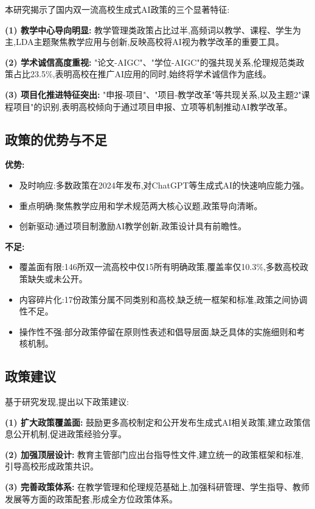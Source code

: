 \documentclass[cn,11pt,chinese]{article}
\begin{document}
本研究揭示了国内双一流高校生成式AI政策的三个显著特征:

\textbf{(1) 教学中心导向明显:} 教学管理类政策占比过半,高频词以教学、课程、学生为主,LDA主题聚焦教学应用与创新,反映高校将AI视为教学改革的重要工具。

\textbf{(2) 学术诚信高度重视:} "论文-AIGC"、"学位-AIGC"的强共现关系,伦理规范类政策占比23.5\%,表明高校在推广AI应用的同时,始终将学术诚信作为底线。

\textbf{(3) 项目化推进特征突出:} "申报-项目"、"项目-教学改革"等共现关系,以及主题2"课程项目"的识别,表明高校倾向于通过项目申报、立项等机制推动AI教学改革。

\subsection{政策的优势与不足}

\textbf{优势:}
\begin{itemize}
\item 及时响应:多数政策在2024年发布,对ChatGPT等生成式AI的快速响应能力强。
\item 重点明确:聚焦教学应用和学术规范两大核心议题,政策导向清晰。
\item 创新驱动:通过项目制激励AI教学创新,政策设计具有前瞻性。
\end{itemize}

\textbf{不足:}
\begin{itemize}
\item 覆盖面有限:146所双一流高校中仅15所有明确政策,覆盖率仅10.3\%,多数高校政策缺失或未公开。
\item 内容碎片化:17份政策分属不同类别和高校,缺乏统一框架和标准,政策之间协调性不足。
\item 操作性不强:部分政策停留在原则性表述和倡导层面,缺乏具体的实施细则和考核机制。
\end{itemize}

\subsection{政策建议}

基于研究发现,提出以下政策建议:

\textbf{(1) 扩大政策覆盖面:} 鼓励更多高校制定和公开发布生成式AI相关政策,建立政策信息公开机制,促进政策经验分享。

\textbf{(2) 加强顶层设计:} 教育主管部门应出台指导性文件,建立统一的政策框架和标准,引导高校形成政策共识。

\textbf{(3) 完善政策体系:} 在教学管理和伦理规范基础上,加强科研管理、学生指导、教师发展等方面的政策配套,形成全方位政策体系。
\end{document}
